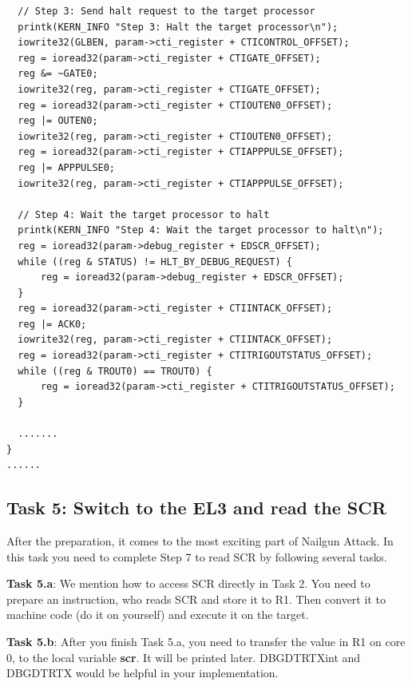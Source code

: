 \begin{lstlisting}
  // Step 3: Send halt request to the target processor
  printk(KERN_INFO "Step 3: Halt the target processor\n");
  iowrite32(GLBEN, param->cti_register + CTICONTROL_OFFSET);
  reg = ioread32(param->cti_register + CTIGATE_OFFSET);
  reg &= ~GATE0;
  iowrite32(reg, param->cti_register + CTIGATE_OFFSET);
  reg = ioread32(param->cti_register + CTIOUTEN0_OFFSET);
  reg |= OUTEN0;
  iowrite32(reg, param->cti_register + CTIOUTEN0_OFFSET);
  reg = ioread32(param->cti_register + CTIAPPPULSE_OFFSET);
  reg |= APPPULSE0;
  iowrite32(reg, param->cti_register + CTIAPPPULSE_OFFSET);

  // Step 4: Wait the target processor to halt
  printk(KERN_INFO "Step 4: Wait the target processor to halt\n");
  reg = ioread32(param->debug_register + EDSCR_OFFSET);
  while ((reg & STATUS) != HLT_BY_DEBUG_REQUEST) {
      reg = ioread32(param->debug_register + EDSCR_OFFSET);
  }
  reg = ioread32(param->cti_register + CTIINTACK_OFFSET);
  reg |= ACK0;
  iowrite32(reg, param->cti_register + CTIINTACK_OFFSET);
  reg = ioread32(param->cti_register + CTITRIGOUTSTATUS_OFFSET);
  while ((reg & TROUT0) == TROUT0) {
      reg = ioread32(param->cti_register + CTITRIGOUTSTATUS_OFFSET);
  }

  .......
}
......
\end{lstlisting}

\subsection{Task 5: Switch to the EL3 and read the SCR}

After the preparation, it comes to the most exciting part of Nailgun Attack. In this task you need to complete Step 7 to read SCR by following several tasks.

\textbf{Task 5.a}: We mention how to access SCR directly in Task 2. You need to prepare an instruction, who reads SCR and store it to R1. Then convert it to machine code (do it on yourself) and execute it on the target.

\textbf{Task 5.b}: After you finish Task 5.a, you need to transfer the value in R1 on core 0, to the local variable \textbf{scr}. It will be printed later. DBGDTRTXint and DBGDTRTX would be helpful in your implementation.

